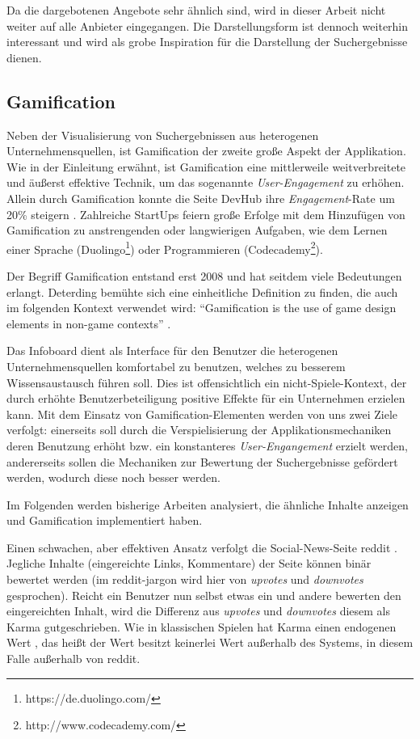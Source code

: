 \documentclass[12pt,twoside]{book}
\begin{document}
Da die dargebotenen Angebote sehr ähnlich sind, wird in dieser Arbeit nicht weiter auf alle Anbieter eingegangen. Die Darstellungsform ist dennoch weiterhin interessant und wird als grobe Inspiration für die Darstellung der Suchergebnisse dienen.


\subsection {Gamification}\label{sec:intro_game}

Neben der Visualisierung  von Suchergebnissen aus heterogenen Unternehmensquellen, ist Gamification der zweite große Aspekt der Applikation. Wie in der Einleitung erwähnt, ist Gamification eine mittlerweile weitverbreitete und äußerst effektive Technik, um das sogenannte \textit{User-Engagement} zu erhöhen. Allein durch Gamification konnte die Seite DevHub ihre \textit{Engagement}-Rate um 20\% steigern \citep[pp. 17]{zichermann2011gamification}. Zahlreiche StartUps feiern große Erfolge mit dem Hinzufügen von Gamification zu anstrengenden oder langwierigen Aufgaben, wie dem Lernen einer Sprache (Duolingo\footnote{https://de.duolingo.com/}) oder Programmieren (Codecademy\footnote{http://www.codecademy.com/}).

Der Begriff Gamification entstand erst 2008 und hat seitdem viele Bedeutungen erlangt. Deterding \cite{deterding2011game} bemühte sich eine einheitliche Definition zu finden, die auch im folgenden Kontext verwendet wird: ``Gamification is the use of game design elements in non-game contexts'' \citep{deterding2011game}.

Das Infoboard dient als Interface für den Benutzer die heterogenen Unternehmensquellen komfortabel zu benutzen, welches zu besserem Wissensaustausch führen soll. Dies ist offensichtlich ein nicht-Spiele-Kontext, der durch erhöhte Benutzerbeteiligung positive Effekte für ein Unternehmen erzielen kann.
Mit dem Einsatz von Gamification-Elementen werden von uns zwei Ziele verfolgt: einerseits soll durch die Verspielisierung der Applikationsmechaniken deren Benutzung erhöht bzw. ein konstanteres \textit{User-Engangement} erzielt werden, andererseits sollen die Mechaniken zur Bewertung der Suchergebnisse gefördert werden, wodurch diese noch besser werden.

Im Folgenden werden bisherige Arbeiten analysiert, die ähnliche Inhalte anzeigen und Gamification implementiert haben.

Einen schwachen, aber effektiven Ansatz verfolgt die Social-News-Seite reddit \cite{reddit}. Jegliche Inhalte (eingereichte Links, Kommentare) der Seite können binär bewertet werden (im reddit-jargon wird hier von \textit{upvotes} und \textit{downvotes} gesprochen). Reicht ein Benutzer nun selbst etwas ein und andere bewerten den eingereichten Inhalt, wird die Differenz aus \textit{upvotes} und \textit{downvotes} diesem als Karma gutgeschrieben. Wie in klassischen Spielen hat Karma einen endogenen Wert \citep[pp. 21 - 22]{costikyan2005have}, das heißt der Wert besitzt keinerlei Wert außerhalb des Systems, in diesem Falle außerhalb von reddit.
\end{document}
